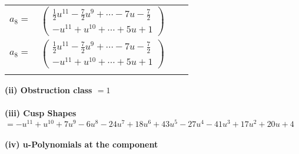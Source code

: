\documentclass[1p]{elsarticle_modified}
\theoremstyle{definition}
\begin{document}
\begin{tabular}{m{7pt} m{180pt} m{7pt} m{180pt} }
\flushright $a_{8}=$&$\begin{pmatrix}\frac{1}{2} u^{11}-\frac{7}{2} u^9+\cdots-7 u-\frac{7}{2}\\- u^{11}+u^{10}+\cdots+5 u+1\end{pmatrix}$\\ \flushright $a_{8}=$&$\begin{pmatrix}\frac{1}{2} u^{11}-\frac{7}{2} u^9+\cdots-7 u-\frac{7}{2}\\- u^{11}+u^{10}+\cdots+5 u+1\end{pmatrix}$\\&\end{tabular}
\flushleft \textbf{(ii) Obstruction class $= 1$}\\~\\
\flushleft \textbf{(iii) Cusp Shapes $= - u^{11}+u^{10}+7 u^9-6 u^8-24 u^7+18 u^6+43 u^5-27 u^4-41 u^3+17 u^2+20 u+4$}\\~\\
\newpage\renewcommand{\arraystretch}{1}
\flushleft \textbf{(iv) u-Polynomials at the component}\newline \\
\end{document}
